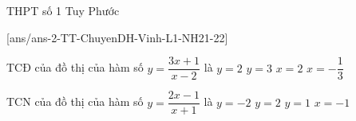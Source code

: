 \begin{name}
	{\tenchude}
	{\tendethi}
	{THPT số 1 Tuy Phước}
	{\thoigian}
\end{name}
[ans/ans-2-TT-ChuyenDH-Vinh-L1-NH21-22]
\begin{ex}%
TCĐ của đồ thị của hàm số $y=\dfrac{3x+1}{x-2}$ là
\choice
{$y=2$}
{$y=3$}
{\True $x=2$}
{$x=-\dfrac{1}{3}$}
\end{ex}

\begin{ex}%
TCN của đồ thị của hàm số $y=\dfrac{2x-1}{x+1}$ là
\choice
{$y=-2$}
{\True $y=2$}
{$y=1$}
{$x=-1$}
\end{ex}

